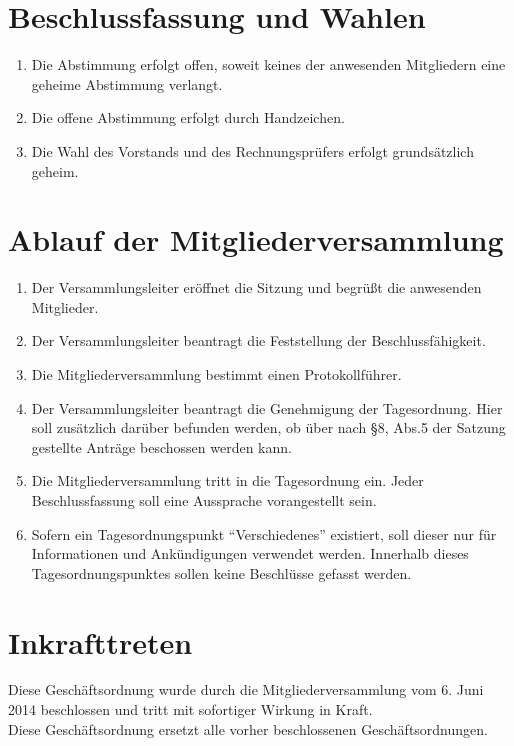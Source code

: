 \documentclass[a4paper, 12pt]{scrartcl}
\begin{document}
\section{Beschlussfassung und Wahlen}
\begin{enumerate}
	\item Die Abstimmung erfolgt offen, soweit keines der anwesenden Mitgliedern eine geheime Abstimmung verlangt.
	\item Die offene Abstimmung erfolgt durch Handzeichen.
	\item Die Wahl des Vorstands und des Rechnungsprüfers erfolgt grundsätzlich geheim.
\end{enumerate}

\section{Ablauf der Mitgliederversammlung}
\begin{enumerate} 
	\item Der Versammlungsleiter eröffnet die Sitzung und begrüßt die anwesenden Mitglieder.
	\item Der Versammlungsleiter beantragt die Feststellung der Beschlussfähigkeit.
	\item Die Mitgliederversammlung bestimmt einen Protokollführer.
	\item Der Versammlungsleiter beantragt die Genehmigung der Tagesordnung. Hier soll zusätzlich darüber befunden werden, ob über nach §8, Abs.5 der Satzung gestellte Anträge beschossen werden kann.
	\item Die Mitgliederversammlung tritt in die Tagesordnung ein. Jeder Beschlussfassung soll eine Aussprache vorangestellt sein.
	\item Sofern ein Tagesordnungspunkt "`Verschiedenes"' existiert, soll dieser nur für Informationen und Ankündigungen verwendet werden. Innerhalb dieses Tagesordnungspunktes sollen keine Beschlüsse gefasst werden.
\end{enumerate}

\section{Inkrafttreten}
Diese Geschäftsordnung wurde durch die Mitgliederversammlung vom 6. Juni 2014 beschlossen und tritt mit sofortiger Wirkung in Kraft.\\
Diese Geschäftsordnung ersetzt alle vorher beschlossenen Geschäftsordnungen.
\end{document}
